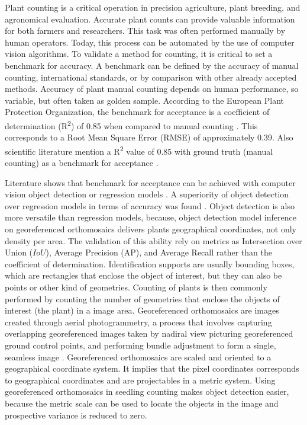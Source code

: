 \documentclass{article}
\begin{document}
Plant counting is a critical operation in precision agriculture, plant breeding, 
and agronomical evaluation. 
Accurate plant counts can provide valuable information for both farmers and researchers.
This task was often performed manually by human operators. 
Today, this process can be automated by the use of computer vision algorithms.
To validate a method for counting, it is critical to set a benchmark for accuracy. 
A benchmark can be defined by the accuracy of manual counting, international standards, 
or by comparison with other already accepted methods.
Accuracy of plant manual counting depends on human performance, so variable, but often taken as golden sample. 
According to the European Plant Protection Organization, the benchmark for acceptance is 
a coefficient of determination (R\textsuperscript{2}) of 0.85 when compared to manual counting \cite{PP13332024}.
This corresponds to a Root Mean Square Error (RMSE) of approximately 0.39.
Also scientific literature mention a R\textsuperscript{2} value of 0.85 with ground truth (manual counting) 
as a benchmark for acceptance \cite{zouMaizeTasselsDetection2020}.

Literature shows that benchmark for acceptance can be achieved with computer vision object detection
\cite{liuIntegrateNetDeepLearning2022,davidPlantDetectionCounting2021,barretoAutomaticUAVbasedCounting2021}
or regression models \cite{liuEstimatingMaizeSeedling2022,EstimatesMaizePlant}.
A superiority of object detection over regression models in terms of accuracy was found
\cite{zouMaizeTasselsDetection2020}. Object detection is also more versatile than
regression models, because, object detection model inference on georeferenced orthomosaics delivers 
plants geographical coordinates, not only density per area.
The validation of this ability rely on metrics as Intersection over Union ($IoU$),
Average Precision (AP), and Average Recall \cite{linMicrosoftCOCOCommon2015} rather than
the coefficient of determination. 
Identification supports are usually bounding boxes, which are rectangles that enclose
the object of interest, but they can also be points or other kind of geometries.
Counting of plants is then commonly performed by counting the number of geometries 
that enclose the objects of interest (the plant) in a image area.
Georeferenced orthomosaics are images created through aerial photogrammetry, a process 
that involves capturing overlapping georeferenced images taken by nadiral view 
picturing georeferenced ground control points, and performing bundle adjustment to form 
a single, seamless image \cite{krausPhotogrammetryGeometryImages2011}.
Georeferenced orthomosaics are scaled and oriented to a geographical coordinate system.
It implies that the pixel coordinates corresponds to 
geographical coordinates and are projectables in a metric system.
Using georeferenced orthomosaics in seedling counting makes object detection 
easier, because the metric scale can be used to locate the objects 
in the image and prospective variance is reduced to zero.
\end{document}
